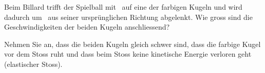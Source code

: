 Beim Billard trifft der Spielball mit \vSpO\ auf eine der farbigen Kugeln und wird dadurch um \alBO\ aus seiner ursprünglichen Richtung abgelenkt. Wie gross sind die Geschwindigkeiten der beiden Kugeln anschliessend?

Nehmen Sie an, dass die beiden Kugeln gleich schwer sind, dass die farbige Kugel vor dem Stoss ruht und dass beim Stoss keine kinetische Energie verloren geht (elastischer Stoss).
